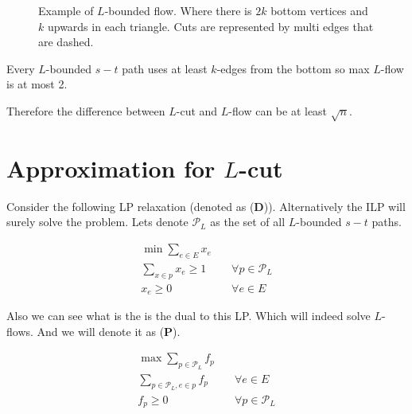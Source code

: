 \begin{figure}[!ht]
	\caption{Example of $L$-bounded flow. Where there is $2k$ bottom vertices and $k$ upwards in each triangle. Cuts are represented by multi edges that are dashed.}
	\label{l-bounded flow}
\end{figure}

\begin{observ}
	Every $L$-bounded $s-t$ path uses at least $k$-edges from the bottom so max $L$-flow is at most 2.
\end{observ}

Therefore the difference between $L$-cut and $L$-flow can be at least $\sqrt{n}$.

\section{Approximation for $L$-cut}

Consider the following LP relaxation (denoted as (\textbf{D})). Alternatively the ILP will surely solve the problem. Lets denote $\mathcal{P}_L$ as the set of all $L$-bounded $s-t$ paths.

$$
\begin{aligned}
	\min \sum_{e \in E} x_e & \\
	\sum_{x \in p} x_e \geq 1 & \quad \forall p \in \mathcal{P}_L \\
	x_e \geq 0 & \quad \forall e \in E
\end{aligned}
$$

Also we can see what is the is the dual to this LP. Which will indeed solve $L$-flows. And we will denote it as (\textbf{P}).

$$
\begin{aligned}
	\max \sum_{p \in \mathcal{P}_L} f_p &\\
	\sum_{p \in \mathcal{P}_L, e \in p} f_p & \quad \forall e \in E\\
	f_p \geq 0 & \quad \forall p \in \mathcal{P}_L
\end{aligned}
$$

